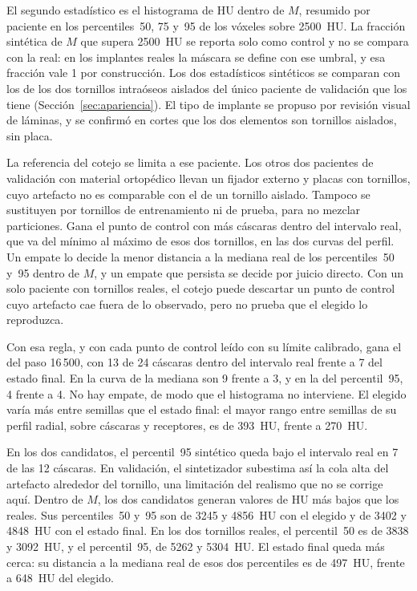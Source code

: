 El segundo estadístico es el histograma de HU dentro de $M$, resumido por paciente en los percentiles~50, 75 y~95 de los vóxeles sobre 2500~HU. La fracción sintética de $M$ que supera 2500~HU se reporta solo como control y no se compara con la real: en los implantes reales la máscara se define con ese umbral, y esa fracción vale 1 por construcción. Los dos estadísticos sintéticos se comparan con los de los dos tornillos intraóseos aislados del único paciente de validación que los tiene (Sección~\ref{sec:apariencia}). El tipo de implante se propuso por revisión visual de láminas, y se confirmó en cortes que los dos elementos son tornillos aislados, sin placa.

La referencia del cotejo se limita a ese paciente. Los otros dos pacientes de validación con material ortopédico llevan un fijador externo y placas con tornillos, cuyo artefacto no es comparable con el de un tornillo aislado. Tampoco se sustituyen por tornillos de entrenamiento ni de prueba, para no mezclar particiones. Gana el punto de control con más cáscaras dentro del intervalo real, que va del mínimo al máximo de esos dos tornillos, en las dos curvas del perfil. Un empate lo decide la menor distancia a la mediana real de los percentiles~50 y~95 dentro de $M$, y un empate que persista se decide por juicio directo. Con un solo paciente con tornillos reales, el cotejo puede descartar un punto de control cuyo artefacto cae fuera de lo observado, pero no prueba que el elegido lo reproduzca.

Con esa regla, y con cada punto de control leído con su límite calibrado, gana el del paso 16\,500, con 13 de 24 cáscaras dentro del intervalo real frente a 7 del estado final. En la curva de la mediana son 9 frente a 3, y en la del percentil~95, 4 frente a 4. No hay empate, de modo que el histograma no interviene. El elegido varía más entre semillas que el estado final: el mayor rango entre semillas de su perfil radial, sobre cáscaras y receptores, es de 393~HU, frente a 270~HU.

En los dos candidatos, el percentil~95 sintético queda bajo el intervalo real en 7 de las 12 cáscaras. En validación, el sintetizador subestima así la cola alta del artefacto alrededor del tornillo, una limitación del realismo que no se corrige aquí. Dentro de $M$, los dos candidatos generan valores de HU más bajos que los reales. Sus percentiles~50 y~95 son de 3245 y 4856~HU con el elegido y de 3402 y 4848~HU con el estado final. En los dos tornillos reales, el percentil~50 es de 3838 y 3092~HU, y el percentil~95, de 5262 y 5304~HU. El estado final queda más cerca: su distancia a la mediana real de esos dos percentiles es de 497~HU, frente a 648~HU del elegido.


